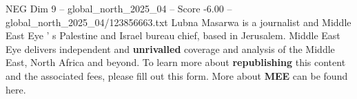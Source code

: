\begin{textsample}{NEG Dim 9 – global\_north\_2025\_04 – Score -6.00 – global\_north\_2025\_04/123856663.txt}
Lubna Masarwa is a journalist and Middle East Eye ' s Palestine and Israel bureau chief, based in Jerusalem.
Middle East Eye delivers independent and \textbf{unrivalled} coverage and analysis of the Middle East, North Africa and beyond.
To learn more about \textbf{republishing} this content and the associated fees, please fill out this form.
More about \textbf{MEE} can be found here.

\end{textsample}
